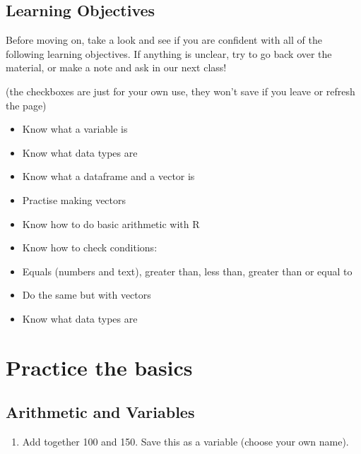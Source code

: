 \documentclass[
  letterpaper,
  DIV=11,
  numbers=noendperiod]{scrreprt}
\newenvironment{Shaded}{\begin{snugshade}}{\end{snugshade}}
\providecommand{\tightlist}{%
  \setlength{\itemsep}{0pt}\setlength{\parskip}{0pt}}
\begin{document}
\section{Learning Objectives}\label{learning-objectives-1}

Before moving on, take a look and see if you are confident with all of
the following learning objectives. If anything is unclear, try to go
back over the material, or make a note and ask in our next class!

(the checkboxes are just for your own use, they won't save if you leave
or refresh the page)

\begin{itemize}
\tightlist
\item[$\square$]
  Know what a variable is
\item[$\square$]
  Know what data types are
\item[$\square$]
  Know what a dataframe and a vector is
\item[$\square$]
  Practise making vectors
\item[$\square$]
  Know how to do basic arithmetic with R
\item[$\square$]
  Know how to check conditions:
\item[$\square$]
  Equals (numbers and text), greater than, less than, greater than or
  equal to
\item[$\square$]
  Do the same but with vectors
\item[$\square$]
  Know what data types are
\end{itemize}

\chapter{Practice the basics}\label{practice-the-basics}

\section{Arithmetic and Variables}\label{arithmetic-and-variables}

\begin{enumerate}
\def\labelenumi{\arabic{enumi}.}
\tightlist
\item
  Add together 100 and 150. Save this as a variable (choose your own
  name).
\end{enumerate}

\begin{Shaded}
\begin{Highlighting}[]

\end{Highlighting}
\end{Shaded}
\end{document}
